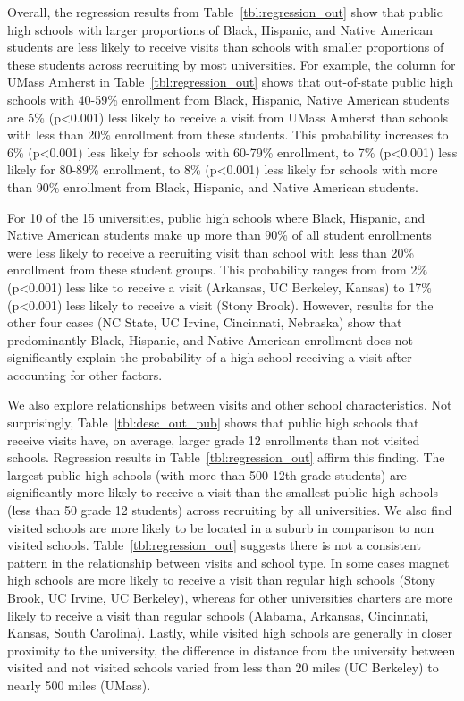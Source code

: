 \documentclass[twoside]{article}
\begin{document}
Overall, the regression results from Table~\ref{tbl:regression_out} show that public high schools with larger proportions of Black, Hispanic, and Native American students are less likely to receive visits than schools with smaller proportions of these students across recruiting by most universities. For example, the column for UMass Amherst in Table~\ref{tbl:regression_out} shows that out-of-state public high schools with 40-59\% enrollment from Black, Hispanic, Native American students are 5\% (p<0.001) less likely to receive a visit from UMass Amherst than schools with less than 20\% enrollment from these students. This probability increases to 6\% (p<0.001) less likely for schools with 60-79\% enrollment, to 7\% (p<0.001) less likely for 80-89\% enrollment, to 8\% (p<0.001) less likely for schools with more than 90\% enrollment from Black, Hispanic, and Native American students. 

For 10 of the 15 universities, public high schools where Black, Hispanic, and Native American students make up more than 90\% of all student enrollments were less likely to receive a recruiting visit than school with less than 20\% enrollment from these student groups. This probability ranges from from 2\% (p<0.001) less like to receive a visit (Arkansas, UC Berkeley, Kansas)  to 17\% (p<0.001) less likely to receive a visit (Stony Brook). However, results for the other four cases (NC State, UC Irvine, Cincinnati, Nebraska) show that predominantly Black, Hispanic, and Native American enrollment does not significantly explain the probability of a high school receiving a visit after accounting for other factors. 

We also explore relationships between visits and other school characteristics. Not surprisingly, Table~\ref{tbl:desc_out_pub} shows that public high schools that receive visits have, on average, larger grade 12 enrollments than not visited schools. Regression results in Table~\ref{tbl:regression_out} affirm this finding. The largest public high schools (with more than 500 12th grade students) are significantly more likely to receive a visit than the smallest public high schools (less than 50 grade 12 students) across recruiting by all universities.  We also find visited schools are more likely to be located in a suburb in comparison to non visited schools. Table~\ref{tbl:regression_out} suggests there is not a consistent pattern in the relationship between visits and school type. In some cases magnet high schools are more likely to receive a visit than regular high schools (Stony Brook, UC Irvine, UC Berkeley), whereas for other universities charters are more likely to receive a visit than regular schools (Alabama, Arkansas, Cincinnati, Kansas, South Carolina). Lastly, while visited high schools are generally in closer proximity to the university, the difference in distance from the university between visited and not visited schools varied from less than 20 miles (UC Berkeley) to nearly 500 miles (UMass). 
\end{document}
